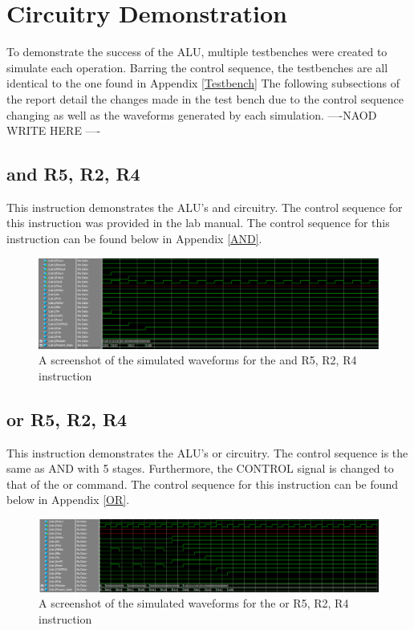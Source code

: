 \documentclass{article}
\begin{document}
\section{Circuitry Demonstration}

    To demonstrate the success of the ALU, multiple testbenches were created to simulate each operation. Barring the control sequence, the testbenches are all identical to the one found in Appendix \ref{Testbench} The following subsections of the report detail the changes made in the test bench due to the control sequence changing as well as the waveforms generated by each simulation. ----NAOD WRITE HERE ----

    \subsection{and R5, R2, R4}
    This instruction demonstrates the ALU's and circuitry. The control sequence for this instruction was provided in the lab manual. The control sequence for this instruction can be found below in Appendix \ref{AND}.
    
    \begin{figure}[h!]
        \begin{center}
            \includegraphics[width=13cm]{and}
            \caption{A screenshot of the simulated waveforms for the and R5, R2, R4 instruction}
        \end{center}
    \end{figure}

    \subsection{or R5, R2, R4}
     This instruction demonstrates the ALU's or circuitry. The control sequence is the same as AND with 5 stages. Furthermore, the CONTROL signal is changed to that of the or command. The control sequence for this instruction can be found below in Appendix \ref{OR}.
     
    \begin{figure}[h!]
        \begin{center}
            \includegraphics[width=13cm]{or}
            \caption{A screenshot of the simulated waveforms for the or R5, R2, R4 instruction}
        \end{center}
    \end{figure}
     
\end{document}
